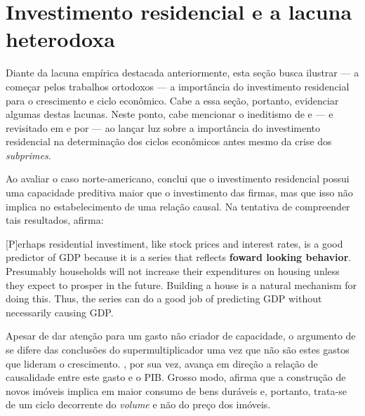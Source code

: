 \section{Investimento residencial e a lacuna heterodoxa}
\label{Secao_Residencial}

Diante da lacuna empírica destacada anteriormente, esta seção busca ilustrar --- a começar pelos trabalhos ortodoxos --- a importância do investimento residencial para o crescimento e ciclo econômico. 
Cabe a essa seção, portanto, evidenciar algumas destas lacunas.
Neste ponto, cabe mencionar o ineditismo de \textcite{green_follow_1997} e \textcite{leamer_housing_2007} --- e revisitado em \textcite{leamer_housing_2015} e por \textcite{fiebiger_trend_2017} --- ao lançar luz sobre a importância do investimento residencial na determinação dos ciclos econômicos antes mesmo da crise dos \textit{subprimes}. 

  


Ao avaliar o caso norte-americano, \textcite{green_follow_1997} conclui que o investimento residencial possui uma capacidade preditiva maior que o investimento das firmas, mas que isso não implica no estabelecimento de uma relação causal. Na tentativa de compreender tais resultados, afirma:

\begin{citacao}

[P]erhaps residential investiment, like stock prices and interest rates, is a good predictor of GDP because it is a series that reflects \textbf{foward looking behavior}. Presumably households will not increase their expenditures on housing unless they expect to prosper in the future. Building a house is a natural mechanism for doing this. Thus, the series can do a good job of predicting GDP without necessarily causing GDP.
\cite[p.~267, grifos adicionados]{green_follow_1997}
\end{citacao}
Apesar de dar atenção para um gasto não criador de capacidade, o argumento de \textcite{green_follow_1997} se difere das conclusões do supermultiplicador uma vez que não são estes gastos que lideram o crescimento.
\textcite{leamer_housing_2007}, por sua vez, avança em direção a relação de causalidade entre este gasto e o PIB. Grosso modo, afirma que a construção de novos imóveis implica em maior consumo de bens duráveis e, portanto, trata-se de um ciclo decorrente do \textit{volume} e não do preço dos imóveis. 


